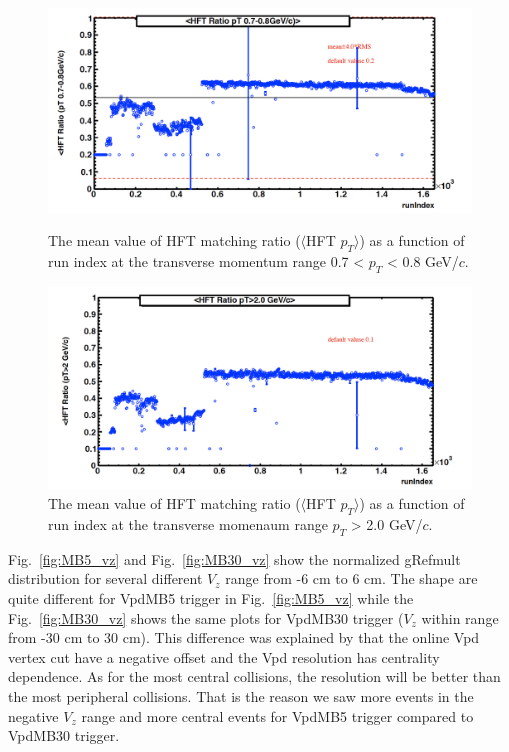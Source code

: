 \begin{figure}[htbp]
\begin{minipage}[htbp]{0.52\linewidth}
\centering
\includegraphics[width=1.0\textwidth]{figure/Run14_D0HFT/centrality_HFTratio.png}
\caption{The mean value of HFT matching ratio ($\langle$HFT $p_{T}$$\rangle$) as a function of run index at the transverse momentum range 0.7 < $p_{T}$ < 0.8 GeV/$c$.\label{fig:centrality_QA3}}
\end{minipage}
\hfill
\begin{minipage}[htbp]{0.52\linewidth}
\centering
\includegraphics[width=1.0\textwidth]{figure/Run14_D0HFT/centrality_HFTratio2.png} 
\caption{The mean value of HFT matching ratio ($\langle$HFT $p_{T}$$\rangle$) as a function of run index at the transverse momenaum range $p_{T}$ > 2.0 GeV/$c$.\label{fig:centrality_QA4}}
\end{minipage}
\end{figure}

Fig.~\ref{fig:MB5_vz} and Fig.~\ref{fig:MB30_vz} show the normalized gRefmult distribution for several different $V_{z}$ range from -6 cm to 6 cm. The shape are quite different for VpdMB5 trigger in Fig.~\ref{fig:MB5_vz} while the Fig.~\ref{fig:MB30_vz} shows the same plots for VpdMB30 trigger ($V_z$ within range from -30 cm to 30 cm). This difference was explained by that the online Vpd vertex cut have a negative offset and the Vpd resolution has centrality dependence. As for the most central collisions, the resolution will be better than the most peripheral collisions. That is the reason we saw more events in the negative $V_{z}$ range and more central events for VpdMB5 trigger compared to VpdMB30 trigger.

